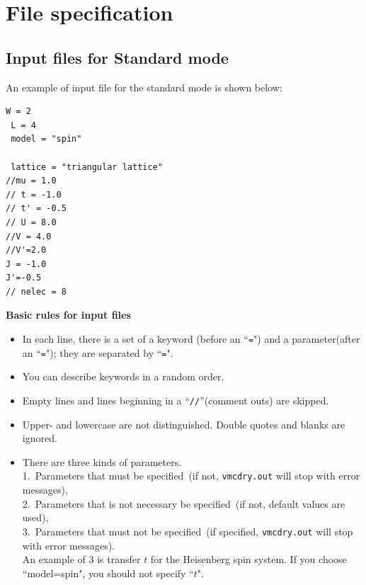 \chapter{File specification}

\section{Input files for Standard mode}
\label{Ch:HowToStandard}

An example of input file for the standard mode is shown below:

\begin{minipage}{10cm}
\begin{screen}
\begin{verbatim}
W = 2
 L = 4
 model = "spin"

 lattice = "triangular lattice"
//mu = 1.0
// t = -1.0
// t' = -0.5
// U = 8.0
//V = 4.0
//V'=2.0
J = -1.0
J'=-0.5
// nelec = 8
\end{verbatim}
\end{screen}
\end{minipage}

{\bf Basic rules for input files}
\begin{itemize}
\item In each line, there is a set of a keyword (before an ``\verb|=|") and a parameter(after an ``\verb|=|"); 
  they are separated by ``\verb|=|".
\item You can describe keywords in a random order.
\item Empty lines and lines beginning in a ``\verb|//|''(comment outs) are skipped.
\item Upper- and lowercase are not distinguished.
  Double quotes and blanks are ignored.
\item There are three kinds of parameters.\\ 
  1.~Parameters that must be specified~(if not, \verb|vmcdry.out| will stop with error messages),\\ 
  2.~Parameters that is not necessary be specified~(if not, default values are used),\\
  3.~Parameters that must not be specified~(if specified, \verb|vmcdry.out| will stop with error messages).\\
  An example of 3 is transfer $t$ for the Heisenberg spin system. 
  If you choose ``model=spin", you should not specify ``$t$".
\end{itemize}

